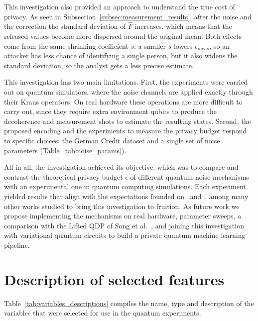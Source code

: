\documentclass{ieeeaccess}
\begin{document}
This investigation also provided an approach to understand the true cost of privacy. As seen in Subsection~\ref{subsec:measurement_results}, after the noise and the correction the standard deviation of $\hat{F}$ increases, which means that the released values become more dispersed around the original mean. Both effects come from the same shrinking coefficient $s$: a smaller $s$ lowers $\epsilon_{meas}$, so an attacker has less chance of identifying a single person, but it also widens the standard deviation, so the analyst gets a less precise estimate.

This investigation has two main limitations. First, the experiments were carried out on quantum simulators, where the noise channels are applied exactly through their Kraus operators. On real hardware these operations are more difficult to carry out, since they require extra environment qubits to produce the decoherence and measurement shots to estimate the resulting states. Second, the proposed encoding and the experiments to measure the privacy budget respond to specific choices: the German Credit dataset and a single set of noise parameters (Table~\ref{tab:noise_params}).

All in all, the investigation achieved its objective, which was to compare and contrast the theoretical privacy budget $\epsilon$ of different quantum noise mechanisms with an experimental one in quantum computing simulations. Each experiment yielded results that align with the expectations founded on~\cite{zhou2017differential} and~\cite{dwork2014algorithmic}, among many other works studied to bring this investigation to fruition. As future work we propose implementing the mechanisms on real hardware, parameter sweeps, a comparison with the Lifted QDP of Song et al.~\cite{song2025hybrid}, and joining this investigation with variational quantum circuits to build a private quantum machine learning pipeline.

\clearpage
\appendices

\renewcommand{\thelemma}{\Alph{section}.\arabic{lemma}}
\renewcommand{\theproposition}{\Alph{section}.\arabic{proposition}}

\section{Description of selected features}
\label{ap:selected_features}

Table~\ref{tab:variables_descriptions} compiles the name, type and description of the variables that were selected for use in the quantum experiments.
\end{document}
